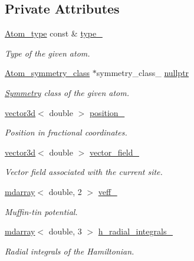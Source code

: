 \subsection*{Private Attributes}
\begin{DoxyCompactItemize}
\item 
\hyperlink{classsirius_1_1_atom__type}{Atom\+\_\+type} const \& \hyperlink{classsirius_1_1_atom_a2f08654850f49540da9e35db272aab0a}{type\+\_\+}
\begin{DoxyCompactList}\small\item\em Type of the given atom. \end{DoxyCompactList}\item 
\hyperlink{classsirius_1_1_atom__symmetry__class}{Atom\+\_\+symmetry\+\_\+class} $\ast$symmetry\+\_\+class\+\_\+ \hyperlink{classsirius_1_1_atom_aea027772299819d737fa1454307bc682}{nullptr}
\begin{DoxyCompactList}\small\item\em \hyperlink{classsirius_1_1_symmetry}{Symmetry} class of the given atom. \end{DoxyCompactList}\item 
\hyperlink{classgeometry3d_1_1vector3d}{vector3d}$<$ double $>$ \hyperlink{classsirius_1_1_atom_af74add3169482e72aba3f9b23130542b}{position\+\_\+}
\begin{DoxyCompactList}\small\item\em Position in fractional coordinates. \end{DoxyCompactList}\item 
\hyperlink{classgeometry3d_1_1vector3d}{vector3d}$<$ double $>$ \hyperlink{classsirius_1_1_atom_a50f70e73b2889ee6594d0f888fe9f1d2}{vector\+\_\+field\+\_\+}
\begin{DoxyCompactList}\small\item\em Vector field associated with the current site. \end{DoxyCompactList}\item 
\hyperlink{classsddk_1_1mdarray}{mdarray}$<$ double, 2 $>$ \hyperlink{classsirius_1_1_atom_a48d48cd4a91c5a2ce036991ae4887cd8}{veff\+\_\+}
\begin{DoxyCompactList}\small\item\em Muffin-\/tin potential. \end{DoxyCompactList}\item 
\hyperlink{classsddk_1_1mdarray}{mdarray}$<$ double, 3 $>$ \hyperlink{classsirius_1_1_atom_a797cadfe559229ff7d2f62ec7fa87c11}{h\+\_\+radial\+\_\+integrals\+\_\+}
\begin{DoxyCompactList}\small\item\em Radial integrals of the Hamiltonian. \end{DoxyCompactList}\item 

\end{DoxyCompactItemize}

